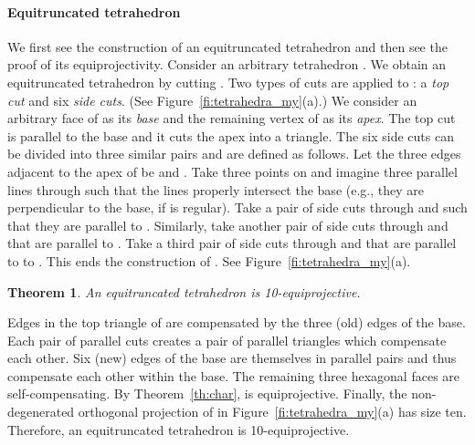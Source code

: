 \documentclass{article}
\newtheorem{theorem}{Theorem}
\newenvironment{proof}
{{\noindent\bf Proof}}{}
\begin{document}
\paragraph{Equitruncated tetrahedron}
We first see the construction of an equitruncated tetrahedron and then see the proof of its equiprojectivity.
Consider an arbitrary tetrahedron .
We obtain an equitruncated tetrahedron  by cutting .
Two types of cuts are applied to : a \emph{top cut} and six \emph{side cuts}. 
(See Figure~\ref{fi:tetrahedra_my}(a).)
We consider an arbitrary face of  as its \emph{base}
and the remaining vertex of  as its \emph{apex}. 
The top cut is parallel to the base and it cuts the apex into a triangle.
The six side cuts can be divided into three similar pairs and are defined as follows.
Let the three edges adjacent to the apex of  be  and .
Take three points  on  and imagine three parallel lines  
through  such that the lines properly intersect the base
(e.g., they are perpendicular to the base, if  is regular).
Take a pair of side cuts through  and  such that they are parallel to .
Similarly, take another pair of side cuts through  and  that are parallel to .
Take a third pair of side cuts through  and  that are parallel to to .
This ends the construction of . See Figure~\ref{fi:tetrahedra_my}(a).

\begin{theorem}
\label{th:P1}
An equitruncated tetrahedron is 10-equiprojective.
\end{theorem}

\begin{proof}
Edges in the top triangle of  are compensated by the three (old) edges of the base.
Each pair of parallel cuts creates a pair of parallel triangles
which compensate each other.
Six (new) edges of the base are themselves in parallel pairs 
and thus compensate each other within the base. 
The remaining three hexagonal faces are self-compensating.
By Theorem~\ref{th:char},  is equiprojective.
Finally, the non-degenerated orthogonal projection of  in Figure~\ref{fi:tetrahedra_my}(a) 
has size ten.
Therefore, an equitruncated tetrahedron is 10-equiprojective.
\end{proof}
\end{document}
